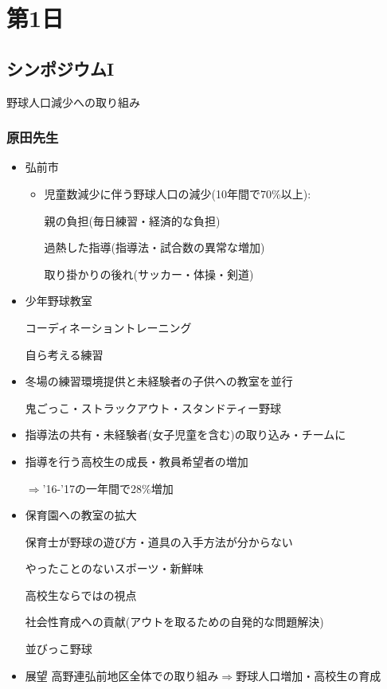 \documentclass[dvipdfmx, 10.5pt]{jsarticle}
\begin{document}
\section{第1日}

\subsection{シンポジウムI}

野球人口減少への取り組み

\subsubsection{原田先生}

  \begin{itemize}
    \item 弘前市
    \begin{itemize}
      \item 児童数減少に伴う野球人口の減少(10年間で70\%以上):

      親の負担(毎日練習・経済的な負担)

      過熱した指導(指導法・試合数の異常な増加)

      取り掛かりの後れ(サッカー・体操・剣道)
    \end{itemize}
    \item 少年野球教室

    コーディネーショントレーニング

    自ら考える練習

    \item 冬場の練習環境提供と未経験者の子供への教室を並行

    鬼ごっこ・ストラックアウト・スタンドティー野球

    \item 指導法の共有・未経験者(女子児童を含む)の取り込み・チームに

    \item 指導を行う高校生の成長・教員希望者の増加

    $\Rightarrow$'16-'17の一年間で28\%増加

    \item 保育園への教室の拡大

    保育士が野球の遊び方・道具の入手方法が分からない

    やったことのないスポーツ・新鮮味

    高校生ならではの視点

    社会性育成への貢献(アウトを取るための自発的な問題解決)

    並びっこ野球

    \item 展望 高野連弘前地区全体での取り組み$\Rightarrow$野球人口増加・高校生の育成

  \end{itemize}
\end{document}
